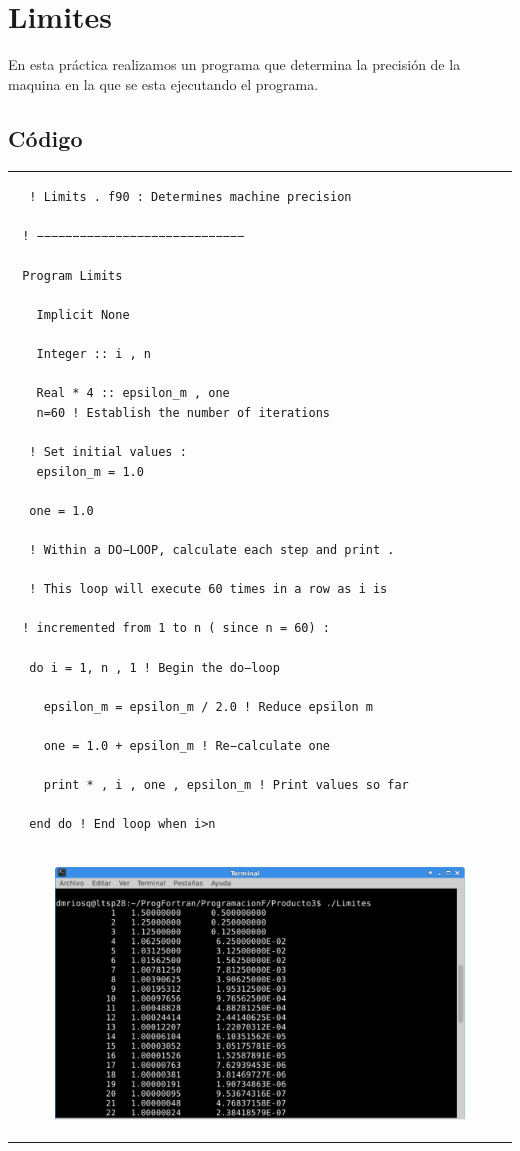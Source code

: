 \documentclass[10pt]{article}
\begin{document}
\section{Limites}
En esta práctica realizamos un programa que determina la precisión de la maquina en la que se esta ejecutando el programa.

\subsection{Código}
\begin{tabular}{l}
\begin{verbatim}  
  ! Limits . f90 : Determines machine precision

 ! −−−−−−−−−−−−−−−−−−−−−−−−−−−−−

 Program Limits

   Implicit None

   Integer :: i , n

   Real * 4 :: epsilon_m , one
   n=60 ! Establish the number of iterations

  ! Set initial values :
   epsilon_m = 1.0

  one = 1.0

  ! Within a DO−LOOP, calculate each step and print .

  ! This loop will execute 60 times in a row as i is

 ! incremented from 1 to n ( since n = 60) :

  do i = 1, n , 1 ! Begin the do−loop

    epsilon_m = epsilon_m / 2.0 ! Reduce epsilon m

    one = 1.0 + epsilon_m ! Re−calculate one

    print * , i , one , epsilon_m ! Print values so far

  end do ! End loop when i>n
\end{verbatim} \\
\begin{figure}
  \centering
    \includegraphics[scale=0.4]{L}
\end{figure}
\end{tabular}
\end{document}
